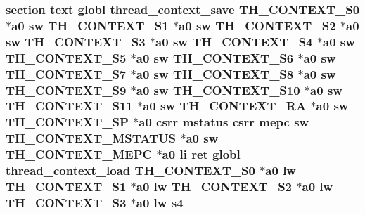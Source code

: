 \hypertarget{riscv_2kpanica_8S_aab76fd0b9db64e1c2604eef2a360ac14}{
\subsubsection[{s4}]{\setlength{\rightskip}{0pt plus 5cm}section text globl {\bf thread\-\_\-context\-\_\-save} {\bf T\-H\-\_\-\-C\-O\-N\-T\-E\-X\-T\-\_\-\-S0} $\ast${\bf a0} {\bf sw} {\bf T\-H\-\_\-\-C\-O\-N\-T\-E\-X\-T\-\_\-\-S1} $\ast${\bf a0} {\bf sw} {\bf T\-H\-\_\-\-C\-O\-N\-T\-E\-X\-T\-\_\-\-S2} $\ast${\bf a0} {\bf sw} {\bf T\-H\-\_\-\-C\-O\-N\-T\-E\-X\-T\-\_\-\-S3} $\ast${\bf a0} {\bf sw} {\bf T\-H\-\_\-\-C\-O\-N\-T\-E\-X\-T\-\_\-\-S4} $\ast${\bf a0} {\bf sw} {\bf T\-H\-\_\-\-C\-O\-N\-T\-E\-X\-T\-\_\-\-S5} $\ast${\bf a0} {\bf sw} {\bf T\-H\-\_\-\-C\-O\-N\-T\-E\-X\-T\-\_\-\-S6} $\ast${\bf a0} {\bf sw} {\bf T\-H\-\_\-\-C\-O\-N\-T\-E\-X\-T\-\_\-\-S7} $\ast${\bf a0} {\bf sw} {\bf T\-H\-\_\-\-C\-O\-N\-T\-E\-X\-T\-\_\-\-S8} $\ast${\bf a0} {\bf sw} {\bf T\-H\-\_\-\-C\-O\-N\-T\-E\-X\-T\-\_\-\-S9} $\ast${\bf a0} {\bf sw} {\bf T\-H\-\_\-\-C\-O\-N\-T\-E\-X\-T\-\_\-\-S10} $\ast${\bf a0} {\bf sw} {\bf T\-H\-\_\-\-C\-O\-N\-T\-E\-X\-T\-\_\-\-S11} $\ast${\bf a0} {\bf sw} {\bf T\-H\-\_\-\-C\-O\-N\-T\-E\-X\-T\-\_\-\-R\-A} $\ast${\bf a0} {\bf sw} {\bf T\-H\-\_\-\-C\-O\-N\-T\-E\-X\-T\-\_\-\-S\-P} $\ast${\bf a0} csrr {\bf mstatus} csrr {\bf mepc} {\bf sw} {\bf T\-H\-\_\-\-C\-O\-N\-T\-E\-X\-T\-\_\-\-M\-S\-T\-A\-T\-U\-S} $\ast${\bf a0} {\bf sw} {\bf T\-H\-\_\-\-C\-O\-N\-T\-E\-X\-T\-\_\-\-M\-E\-P\-C} $\ast${\bf a0} {\bf li} ret globl {\bf thread\-\_\-context\-\_\-load} {\bf T\-H\-\_\-\-C\-O\-N\-T\-E\-X\-T\-\_\-\-S0} $\ast${\bf a0} {\bf lw} {\bf T\-H\-\_\-\-C\-O\-N\-T\-E\-X\-T\-\_\-\-S1} $\ast${\bf a0} {\bf lw} {\bf T\-H\-\_\-\-C\-O\-N\-T\-E\-X\-T\-\_\-\-S2} $\ast${\bf a0} {\bf lw} {\bf T\-H\-\_\-\-C\-O\-N\-T\-E\-X\-T\-\_\-\-S3} $\ast${\bf a0} {\bf lw} s4}}\label{riscv_2kpanica_8S_aab76fd0b9db64e1c2604eef2a360ac14}
